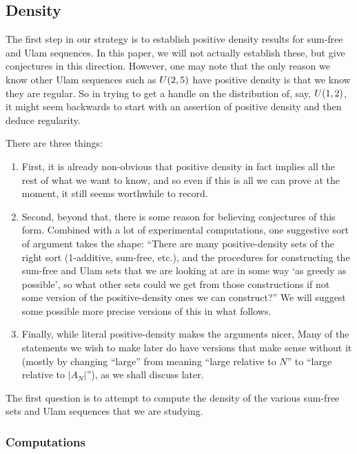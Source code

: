 \documentclass{article}
\theoremstyle{definition}
\theoremstyle{remark}
\numberwithin{equation}{section}
\begin{document}
{\subsection{Density}

The first step in our strategy is to establish positive density
results for sum-free and Ulam sequences.  In this paper, we will not
actually establish these, but give conjectures in this direction.
However, one may note that the only reason we know other Ulam
sequences such as $U(2,5)$ have positive density is that we know
they are regular.  So in trying to get a handle on the distribution
of, say, $U(1,2)$, it might seem backwards to start with an
assertion of positive density and then deduce regularity.

There are three things: 

\begin{enumerate}
\item First, it is already non-obvious that positive density in fact
  implies all the rest of what we want to know, and so even if this is
  all we can prove at the moment, it still seems worthwhile to record.
\item Second, beyond that, there is some reason for believing
  conjectures of this form.  Combined with a lot of experimental
  computations, one suggestive sort of argument takes the shape:
  ``There are many positive-density sets of the right sort
  (1-additive, sum-free, etc.), and the procedures for constructing
  the sum-free and Ulam sets that we are looking at are in some way
  `as greedy as possible', so what other sets could we get from those
  constructions if not some version of the positive-density ones we
  can construct?''  We will suggest some possible more precise
  versions of this in what follows.
\item Finally, while literal positive-density makes the arguments
  nicer, Many of the statements we wish to make later do have versions
  that make sense without it (mostly by changing ``large'' from
  meaning ``large relative to $N$'' to ``large relative to $|A_N|$''),
  as we shall discuss later.
\end{enumerate}

The first question is to attempt to compute the density of the various
sum-free sets and Ulam sequences that we are studying.  

\subsubsection{Computations}

}
\end{document}
